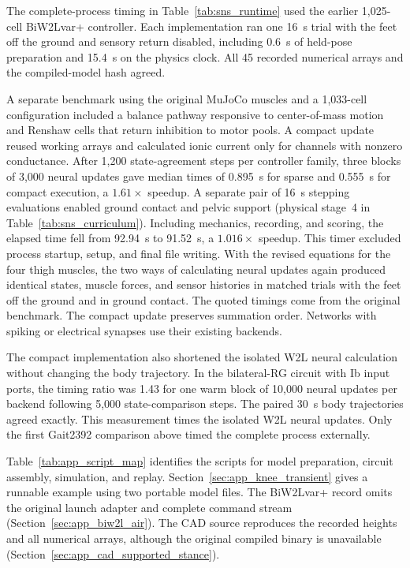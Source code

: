 The complete-process timing in Table~\ref{tab:sns_runtime} used the earlier 1,025-cell BiW2Lvar+ controller. Each implementation ran one \qty{16}{\second} trial with the feet off the ground and sensory return disabled, including \qty{0.6}{\second} of held-pose preparation and \qty{15.4}{\second} on the physics clock. All 45 recorded numerical arrays and the compiled-model hash agreed.

A separate benchmark using the original MuJoCo muscles and a 1,033-cell configuration included a balance pathway responsive to center-of-mass motion and Renshaw cells that return inhibition to motor pools. A compact update reused working arrays and calculated ionic current only for channels with nonzero conductance. After 1,200 state-agreement steps per controller family, three blocks of 3,000 neural updates gave median times of \qty{0.895}{\second} for sparse and \qty{0.555}{\second} for compact execution, a $1.61\times$ speedup. A separate pair of \qty{16}{\second} stepping evaluations enabled ground contact and pelvic support (physical stage~4 in Table~\ref{tab:sns_curriculum}). Including mechanics, recording, and scoring, the elapsed time fell from \qty{92.94}{\second} to \qty{91.52}{\second}, a $1.016\times$ speedup. This timer excluded process startup, setup, and final file writing. With the revised equations for the four thigh muscles, the two ways of calculating neural updates again produced identical states, muscle forces, and sensor histories in matched trials with the feet off the ground and in ground contact. The quoted timings come from the original benchmark. The compact update preserves summation order. Networks with spiking or electrical synapses use their existing backends.

The compact implementation also shortened the isolated W2L neural calculation without changing the body trajectory. In the bilateral-RG circuit with Ib input ports, the timing ratio was 1.43 for one warm block of 10,000 neural updates per backend following 5,000 state-comparison steps. The paired \qty{30}{\second} body trajectories agreed exactly. This measurement times the isolated W2L neural updates. Only the first Gait2392 comparison above timed the complete process externally.

Table~\ref{tab:app_script_map} identifies the scripts for model preparation, circuit assembly, simulation, and replay. Section~\ref{sec:app_knee_transient} gives a runnable example using two portable model files. The BiW2Lvar+ record omits the original launch adapter and complete command stream (Section~\ref{sec:app_biw2l_air}). The CAD source reproduces the recorded heights and all numerical arrays, although the original compiled binary is unavailable (Section~\ref{sec:app_cad_supported_stance}).

